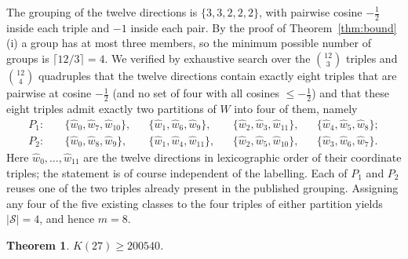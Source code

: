 \documentclass[11pt]{amsart}
\newtheorem{theorem}{Theorem}
\theoremstyle{remark}
\newcommand{\wh}{\widehat{w}}
\begin{document}
The grouping of the twelve directions is $\{3,3,2,2,2\}$, with pairwise cosine
$-\tfrac12$ inside each triple and $-1$ inside each pair. By the proof of
Theorem~\ref{thm:bound}(i) a group has at most three members, so the minimum
possible number of groups is $\lceil 12/3\rceil=4$. We verified by exhaustive
search over the $\binom{12}{3}$ triples and $\binom{12}{4}$ quadruples that the
twelve directions contain exactly eight triples that are pairwise at cosine
$-\tfrac12$ (and no set of four with all cosines $\le-\tfrac12$) and that
these eight triples admit exactly two partitions of $W$ into four of them,
namely
\[
\begin{aligned}
   P_1:\quad&\{\wh_0,\wh_7,\wh_{10}\},&&\{\wh_1,\wh_6,\wh_9\},
   &&\{\wh_2,\wh_3,\wh_{11}\},&&\{\wh_4,\wh_5,\wh_8\};\\
   P_2:\quad&\{\wh_0,\wh_8,\wh_9\},   &&\{\wh_1,\wh_4,\wh_{11}\},
   &&\{\wh_2,\wh_5,\wh_{10}\},&&\{\wh_3,\wh_6,\wh_7\}.
\end{aligned}
\]
Here $\wh_0,\dots,\wh_{11}$ are the twelve directions in lexicographic order of
their coordinate triples; the statement is of course independent of the
labelling. Each of $P_1$ and $P_2$ reuses one of the two triples already present
in the published grouping. Assigning any four of the five existing classes to
the four triples of either partition yields $|\mathcal S|=4$, and hence $m=8$.

\begin{theorem}\label{thm:main}
$K(27)\ge 200540$.
\end{theorem}
\end{document}
